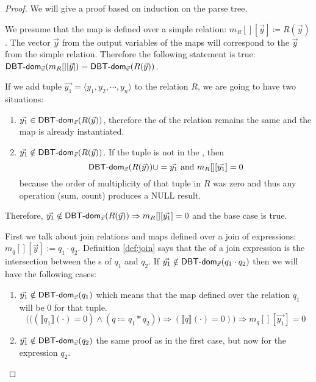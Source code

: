 \documentclass[12pt]{article}
\begin{document}
\begin{proof}
We will give a proof based on induction on the parse tree.

We presume that the map is defined over a simple relation: $m_R[][\vec{y}]\coloneqq R(\vec{y})$. The vector $\vec{y}$ from the output variables of the maps will correspond to the $\vec{y}$ from the simple relation. Therefore the following statement is true: $\textsf{DBT-dom}{}_{\vec{x}}(m_R[][\vec{y}])=\textsf{DBT-dom}{}_{\vec{x}}(R(\vec{y}))$.

If we add tuple $\vec{y_1}=\langle y_1,y_2,\cdots,y_n\rangle$ to the relation $R$, we are going to have two situations:
\begin{enumerate}
\item $\vec{y_1}\in\textsf{DBT-dom}{}_{\vec{x}}(R(\vec{y}))$, therefore the \dom{} of the relation remains the same and the map is already instantiated.
\item $\vec{y_1}\notin\textsf{DBT-dom}{}_{\vec{x}}(R(\vec{y}))$. If the tuple is not in the \dom{}, then $$\textsf{DBT-dom}{}_{\vec x}(R(\vec y))\cup=\vec{y_1}\mbox{ and }m_{R}[][\vec{y_1}]=0$$ because the order of multiplicity of that tuple in $R$ was zero and thus any operation (sum, count) produces a NULL result.
\end{enumerate}
Therefore, $\vec{y_1}\notin\textsf{DBT-dom}{}_{\vec{x}}(R(\vec{y}))\Rightarrow m_R[][\vec{y_1}]=0$ and the base case is true.

First we talk about join relations and maps defined over a join of expressions: $m_q[][\vec{y}]:=q_1\cdot q_2$. Definition \ref{def:join} says that the \dom{} of a join expression is the intersection between the \dom{}s of $q_1$ and $q_2$. If $\vec{y_1}\notin\textsf{DBT-dom}{}_{\vec{x}}(q_1\cdot q_2)$ then we will have the following cases:
\begin{enumerate}
\item $\vec{y_1}\notin\textsf{DBT-dom}{}_{\vec{x}}(q_1)$ which means that the map defined over the relation $q_1$ will be 0 for that tuple.
\begin{equation}
\Big(\big((\llbracket q_{1}\rrbracket(\cdot)=0)\land (q\coloneqq q_{1}*q_{2})\big)\Rightarrow (\llbracket q\rrbracket(\cdot)=0)\Big)\Rightarrow m_{q}[][\vec{y_{1}}]=0
\end{equation}
\item $\vec{y_{1}}\notin\textsf{DBT-dom}{}_{\vec{x}}(q_2)$ the same proof as in the first case, but now for the expression $q_2$.
\end{enumerate}


\end{proof}
\end{document}
